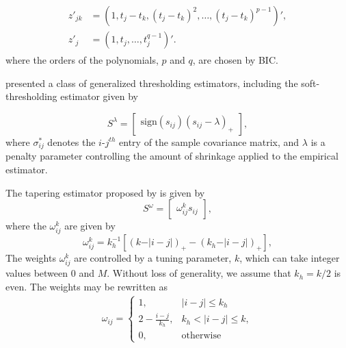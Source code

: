 \begin{align}
\begin{split} 
z'_{jk} &= \left(1, t_j - t_k, \left(t_j - t_k\right)^2,\dots, \left(t_j - t_k\right)^{p-1}\right)', \\
z'_{j}  &= \left(1, t_j, \dots, t_j^{q-1}\right)'.
\end{split}
\end{align} \label{eq:mcd-polynomial-model}
\noindent
where the orders of the polynomials, $p$ and $q$, are chosen by BIC. 

\bigskip

\cite{rothman2009generalized} presented a class of generalized thresholding estimators, including the soft-thresholding estimator given by

\[
S^{\lambda}=   \begin{bmatrix} \mbox{sign}\left(s_{ij}\right) \left(s_{ij} - \lambda\right)_+ \end{bmatrix},
\]
\noindent 
where $\sigma^*_{ij}$ denotes the $i$-$j^{th}$ entry of the sample covariance matrix, and $\lambda$ is a penalty parameter controlling the amount of shrinkage applied to the empirical estimator. 

\bigskip

The tapering estimator proposed by \cite{cai2010optimal} is given by
\[
S^{\omega} =  \begin{bmatrix} \omega_{ij}^k s_{ij} \end{bmatrix},
\]
\noindent
where the $\omega_{ij}^k$ are given by 
\begin{equation*}
\omega^k_{ij} = k_h^{-1} \left[ \left( k - \vert i-j\vert\right)_+ - \left(k_h - \vert i-j\vert\right)_+ \right],
\end{equation*}
\noindent
The weights $\omega^k_{ij}$ are controlled by a tuning parameter, $k$,  which can take integer values between 0 and $M$. Without loss of generality,  we assume that $k_h = k/2$ is even. The weights may be rewritten as
\begin{align*}
\omega_{ij} = \left\{\begin{array}{ll} 1, & \vert i -j \vert \le k_h \\
                             2 - \frac{i - j}{k_h}, & k_h < \vert  i -j \vert \le k, \\
                             0, & \mbox{otherwise}  \end{array} \right.
\end{align*}
\noindent

\bigskip

